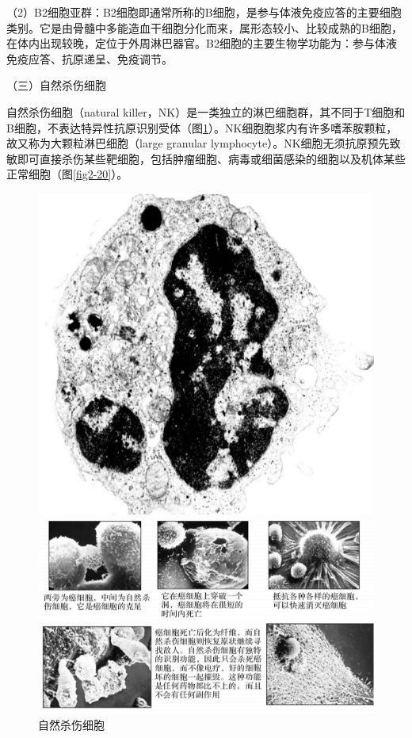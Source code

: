 （2）B2细胞亚群：B2细胞即通常所称的B细胞，是参与体液免疫应答的主要细胞类别。它是由骨髓中多能造血干细胞分化而来，属形态较小、比较成熟的B细胞，在体内出现较晚，定位于外周淋巴器官。B2细胞的主要生物学功能为：参与体液免疫应答、抗原递呈、免疫调节。

（三）自然杀伤细胞

自然杀伤细胞（natural
killer，NK）是一类独立的淋巴细胞群，其不同于T细胞和B细胞，不表达特异性抗原识别受体（图\ref{fig2-19}）。NK细胞胞浆内有许多嗜苯胺颗粒，故又称为大颗粒淋巴细胞（large
granular
lymphocyte）。NK细胞无须抗原预先致敏即可直接杀伤某些靶细胞，包括肿瘤细胞、病毒或细菌感染的细胞以及机体某些正常细胞（图\ref{fig2-20}）。
\begin{figure}[!htbp]
    \centering
    \begin{minipage}[b]{0.45\textwidth} 
        \includegraphics[height=0.12\textheight]{./images/Image00044.jpg}
        \captionsetup{justification=centering}
        \caption{自然杀伤细胞}
        \label{fig2-19}
    \end{minipage}
\begin{minipage}[b]{0.45\textwidth} 
    \includegraphics[height=0.2\textheight]{./images/Image00045.jpg}

\end{minipage}
\end{figure}
